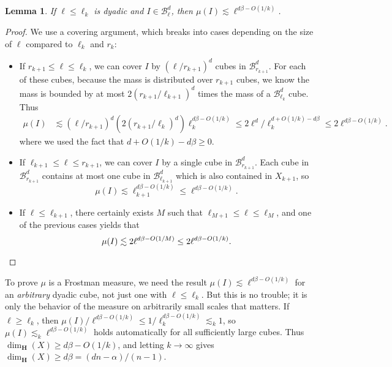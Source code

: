 \documentclass[usenames,dvipsnames,letterpaper, reqno,11pt]{article}
\theoremstyle{plain}
\newtheorem{lemma}{Lemma}
\theoremstyle{plain}
\begin{document}
\begin{lemma}
	If $\ell \leq \ell_k$ is dyadic and $I \in \mathcal{B}^d_\ell$, then $\mu(I) \lesssim \ell^{d\beta - O(1/k)}$.
\end{lemma}
\begin{proof}
	We use a covering argument, which breaks into cases depending on the size of $\ell$ compared to $\ell_k$ and $r_k$:
	\begin{itemize}
		\item If $r_{k+1} \leq \ell \leq \ell_k$, we can cover $I$ by $(\ell/r_{k+1})^d$ cubes in $\mathcal{B}^d_{r_{k+1}}$. For each of these cubes, because the mass is distributed over $r_{k+1}$ cubes, we know the mass is bounded by at most $2(r_{k+1}/\ell_{k+1})^d$ times the mass of a $\mathcal{B}^d_{\ell_k}$ cube. Thus
		\begin{align*}
			\mu(I) &\lesssim (\ell/r_{k+1})^d (2(r_{k+1}/\ell_k)^d) \ell_k^{d \beta - O(1/k)} \leq 2 \ell^d / \ell_k^{d + O(1/k) - d \beta} \leq 2 \ell^{d \beta - O(1/k)}.
		\end{align*}
		where we used the fact that $d + O(1/k) - d\beta \geq 0$.

		\item If $\ell_{k+1} \leq \ell \leq r_{k+1}$, we can cover $I$ by a single cube in $\mathcal{B}^d_{r_{k+1}}$. Each cube in $\mathcal{B}^d_{r_{k+1}}$ contains at most one cube in $\mathcal{B}^d_{\ell_{k+1}}$ which is also contained in $X_{k+1}$, so
		\[ \mu(I) \lesssim \ell_{k+1}^{d\beta - O(1/k)} \leq \ell^{d \beta - O(1/k)}. \]

		\item If $\ell \leq \ell_{k+1}$, there certainly exists $M$ such that $\ell_{M+1} \leq \ell \leq \ell_M$, and one of the previous cases yields that
		\[ \mu(I) \lesssim 2 \ell^{d \beta - O(1/M)} \leq 2 \ell^{d \beta - O(1/k)}. \qedhere \]
	\end{itemize}
\end{proof}

To prove $\mu$ is a Frostman measure, we need the result $\mu(I) \lesssim \ell^{d \beta - O(1/k)}$ for an {\it arbitrary} dyadic cube, not just one with $\ell \leq \ell_k$. But this is no trouble; it is only the behavior of the measure on arbitrarily small scales that matters. If $\ell \geq \ell_k$, then $\mu(I)/\ell^{d \beta - O(1/k)} \leq 1/\ell_k^{d \beta - O(1/k)} \lesssim_k 1$, so $\mu(I) \lesssim_k \ell^{d \beta - O(1/k)}$ holds automatically for all sufficiently large cubes. Thus $\dim_{\mathbf{H}}(X) \geq d \beta - O(1/k)$, and letting $k \to \infty$ gives $\dim_{\mathbf{H}}(X) \geq d \beta = (dn - \alpha)/(n-1)$.
\end{document}
